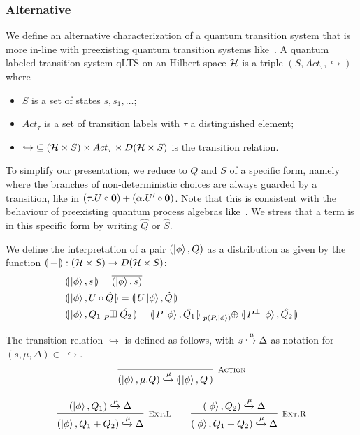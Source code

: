 \subsubsection{Alternative}
We define an alternative characterization of a quantum transition system that is more in-line with preexisting quantum transition systems like~\cite{Feng:2012, Deng:2012}.
A quantum labeled transition system qLTS on an Hilbert space $\mathcal{H}$ is a triple $(S, Act_\tau, \hookrightarrow)$ where
\begin{itemize}
	\item $S$ is a set of states $s, s_1, \dots$;
	\item $Act_\tau$ is a set of transition labels with $\tau$ a distinguished element;
  \item $\hookrightarrow\;\subseteq (\mathcal{H} \times S) \times Act_\tau \times D(\mathcal{H} \times S)$ is the transition relation. 
\end{itemize}

To simplify our presentation, we reduce to $Q$ and $S$ of a specific form, namely where the branches of non-deterministic choices are always guarded by a transition, like in $(\tau. U \circ \mathbf{0}) + (\alpha . U' \circ \mathbf{0})$.
Note that this is consistent with the behaviour of preexisting quantum process algebras like~\cite{Feng:2012, Deng:2012}.
We stress that a term is in this specific form by writing $\hat{Q}$ or $\hat{S}$.

We define the interpretation of a pair $(\ket{\phi}, Q)$ as a distribution as given by the function $\llparenthesis\,{-}\,\rrparenthesis : (\mathcal{H} \times S) \to D(\mathcal{H} \times S)$:
\begin{align*}
	&\sema{\ket{\phi}, s} = \overline{(\ket{\phi}, s)} \\
	&\sema{\ket{\phi}, U \circ \hat{Q}} = \sema{U\ket{\phi}, \hat{Q}} \\
	&\sema{\ket{\phi}, Q_1 \qsum{P} \hat{Q_2} } = \sema{P \ket{\phi}, \hat{Q_1}} \psum{p(P, \ket{\phi})} \sema{P^{\bot}\ket{\phi}, \hat{Q_2}} 
\end{align*}

The transition relation $\hookrightarrow$ is defined as follows, with $s \xhookrightarrow{\mu} \Delta$ as notation for $(s, \mu, \Delta) \in\;\hookrightarrow$.
\begin{gather*}
  \infer[\mbox{\footnotesize\scshape Action}]{(\ket{\phi}, \mu.Q) \xhookrightarrow{\mu} \sema{\ket{\phi}, Q}}{} \\[0.3cm]
  \infer[\mbox{\footnotesize\scshape Ext.L}]{(\ket{\phi}, Q_1 + Q_2) \xhookrightarrow{\mu} \Delta}{(\ket{\phi}, Q_1) \xhookrightarrow{\mu} \Delta} \qquad
  \infer[\mbox{\footnotesize\scshape Ext.R}]{(\ket{\phi}, Q_1 + Q_2) \xhookrightarrow{\mu} \Delta}{(\ket{\phi}, Q_2) \xhookrightarrow{\mu} \Delta}
\end{gather*}

